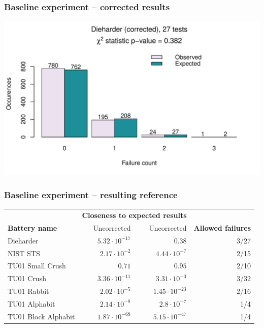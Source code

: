 \documentclass[aspectratio=169]{beamer}
\newcommand{\gr}{\cellcolor{green!40}}
\begin{document}
\begin{frame}
\frametitle{Baseline experiment -- corrected results}
\begin{nomar}
\centering
\includegraphics[width=.85\textwidth]{figures/dieharder-corr.pdf} 
\end{nomar}
\end{frame}

\begin{frame}
\frametitle{Baseline experiment -- resulting reference}
\begin{table}
\begin{nomar}
\centering
\begin{tabular}{@{}lrrr@{}}
\toprule
                      & \multicolumn{2}{c}{\textbf{Closeness to expected results}}               &                           \\ \cmidrule(lr){2-3}
\textbf{Battery name} & Uncorrected               & Uncorrected              & \textbf{Allowed failures} \\ \midrule

Dieharder             &    $5.32 \cdot 10^{-17}$  & \gr$0.38$                & 3/27 \\ 
NIST STS              & \gr$2.17 \cdot 10^{-2}$   &    $4.44 \cdot 10^{-7}$  & 2/15 \\ 
TU01 Small Crush      &    $0.71$                 & \gr$0.95$                & 2/10 \\ 
TU01 Crush            &    $3.36 \cdot 10^{-11}$  & \gr$3.31 \cdot 10^{-3}$  & 3/32 \\ 
TU01 Rabbit           & \gr$2.02 \cdot 10^{-5}$   &    $1.45 \cdot 10^{-23}$ & 2/16 \\ 
TU01 Alphabit         &    $2.14 \cdot 10^{-8}$   & \gr$2.8 \cdot 10^{-7}$   & 1/4 \\ 
TU01 Block Alphabit   &    $1.87 \cdot 10^{-68}$  & \gr$5.15 \cdot 10^{-47}$ & 1/4 \\
\bottomrule
\end{tabular}
\end{nomar}
\end{table}
\end{frame}
\end{document}
